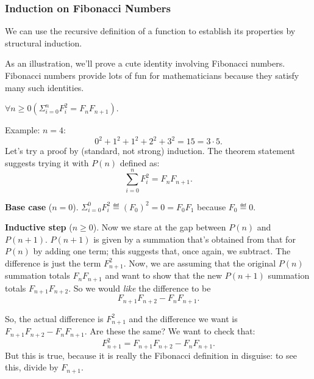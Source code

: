\begin{problems}
\begin{editingnotes}
\subsubsection{Induction on Fibonacci Numbers}

We can use the recursive definition of a function to establish its
properties by structural induction.

As an illustration, we'll prove a cute identity involving Fibonacci
numbers.  Fibonacci numbers provide lots of fun for mathematicians because
they satisfy many such identities.
\begin{proposition}
  $\forall n \geq 0 (\Sigma_{i=0}^n F_i^2 = F_n F_{n+1})$.
\end{proposition}

Example: $n = 4$:
\[
0^2 + 1^2 + 1^2 + 2^2 + 3^2 = 15 = 3 \cdot 5.
\]
Let's try a proof by (standard, not strong) induction.  The theorem
statement suggests trying it with $P(n)$ defined as:
\[
\sum_{i=0}^n F_i^2 = F_n F_{n+1}.
\]

\textbf{Base case} ($n=0$). 
$\Sigma_{i=0}^0 F_i^2 \eqdef (F_0)^2 = 0 = F_0 F_1$ because
$F_0 \eqdef 0$.

\textbf{Inductive step} ($n\geq 0$).  Now we stare at the gap between
$P(n)$ and $P(n+1)$.  $P(n+1)$ is given by a summation that's obtained
from that for $P(n)$ by adding one term; this suggests that, once again,
we subtract.  The difference is just the term $F_{n+1}^2$.  Now, we are
assuming that the original $P(n)$ summation totals $F_n F_{n+1}$ and want
to show that the new $P(n+1)$ summation totals $F_{n+1} F_{n+2}$.  So we
would \emph{like} the difference to be
\[
F_{n+1} F_{n+2} - F_n F_{n+1}.
\]

So, the actual difference is $F_{n+1}^2$ and the difference we want is
$F_{n+1} F_{n+2} - F_n F_{n+1}$.  Are these the same?  We want to check
that:
\[
F_{n+1}^2 = F_{n+1} F_{n+2} - F_n F_{n+1}.
\]
But this is true, because it is really the Fibonacci definition in
disguise: to see this, divide by $F_{n+1}$.

\end{editingnotes}

\end{problems}
